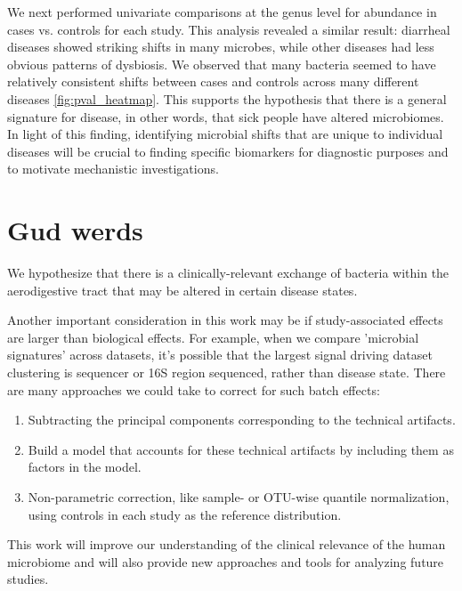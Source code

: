 \documentclass[12pt]{article}
\begin{document}
We next performed univariate comparisons at the genus level for abundance in cases 
vs. controls for each study. This analysis revealed a similar result: diarrheal 
diseases showed striking shifts in many microbes, while other
diseases had less obvious patterns of dysbiosis. We observed that many bacteria
seemed to have relatively consistent shifts between cases and controls across many
different diseases \ref{fig:pval_heatmap}. This supports the hypothesis that
there is a general signature for disease, in other words, that sick people have 
altered microbiomes. In light of this finding, identifying microbial shifts that 
are unique to individual diseases will be crucial to finding specific biomarkers
for diagnostic purposes and to motivate mechanistic investigations.

\section{Gud werds}
We hypothesize that there is a clinically-relevant exchange of bacteria within the aerodigestive tract that may be altered in certain disease states. 


Another important consideration in this work may be if study-associated effects are larger than biological effects. For example, when we compare 'microbial signatures' across datasets, it's possible that the largest signal driving dataset clustering is sequencer or 16S region sequenced, rather than disease state. There are many approaches we could take to correct for such batch effects:
\begin{enumerate}
	\item Subtracting the principal components corresponding to the technical artifacts.
	\item Build a model that accounts for these technical artifacts by including them as factors in the model.
	\item Non-parametric correction, like sample- or OTU-wise quantile normalization, using controls in each study as the reference distribution.
\end{enumerate}

This work will improve our 
understanding of the clinical relevance of the human microbiome and 
will also provide new approaches and tools for analyzing future 
studies.
\end{document}
